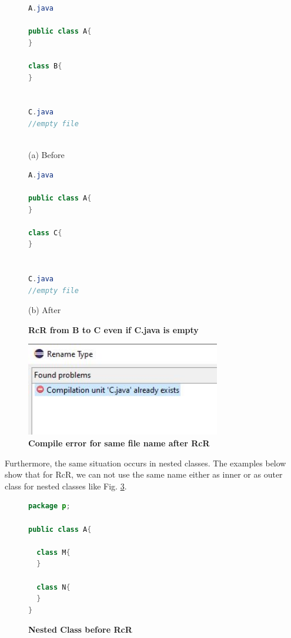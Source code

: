 \begin{figure}[th]
\centering
\begin{minipage}[t]{0.45\linewidth}
\begin{lstlisting}[language=java, basicstyle=\scriptsize\ttfamily,frame=single]
A.java

public class A{
}
	
class B{
}


C.java
//empty file
 
\end{lstlisting}
\centering(a) Before
\end{minipage}
\hfill
\begin{minipage}[t]{0.45\linewidth}
\begin{lstlisting}[language=java, basicstyle=\scriptsize\ttfamily,frame=single]
A.java

public class A{
}
	
class C{
}


C.java
//empty file

\end{lstlisting}
\centering(b) After
\end{minipage}
\caption{\textbf{RcR from B to C even if C.java is empty}}
\label{fig:empty}
\end{figure}

\begin{figure}[H]
\centerline{\includegraphics[width=85mm,scale=0.5]{EFE.jpg}}
\caption{\textbf{Compile error for same file name after RcR}}
\label{fig:efr}
\end{figure}


Furthermore, the same situation occurs in nested classes. The examples below show that for RcR, we can not use the same name either as inner or as outer class for nested classes like Fig. \ref{fig:original}.

\begin{figure}[th]
\centering
\begin{minipage}[t]{0.5\linewidth}
\begin{lstlisting}[language=java, basicstyle=\scriptsize\ttfamily,frame=single]
package p;

public class A{	

  class M{
  }

  class N{
  }
} 
\end{lstlisting}
\end{minipage}
\caption{\textbf{Nested Class before RcR}}
\label{fig:original}
\end{figure}

